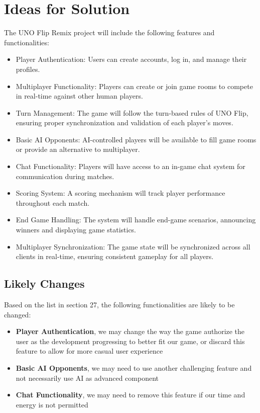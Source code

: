 \documentclass{article}
\begin{document}
\section{Ideas for Solution}
The UNO Flip Remix project will include the following features and functionalities:
\begin{itemize}
    \item Player Authentication: Users can create accounts, log in, and manage their profiles.
    \item Multiplayer Functionality: Players can create or join game rooms to compete in real-time against other human players.
    \item Turn Management: The game will follow the turn-based rules of UNO Flip, ensuring proper synchronization and validation of each player's moves.
    \item Basic AI Opponents: AI-controlled players will be available to fill game rooms or provide an alternative to multiplayer.
    \item Chat Functionality: Players will have access to an in-game chat system for communication during matches.
    \item Scoring System: A scoring mechanism will track player performance throughout each match.
    \item End Game Handling: The system will handle end-game scenarios, announcing winners and displaying game statistics.
    \item Multiplayer Synchronization: The game state will be synchronized across all clients in real-time, ensuring consistent gameplay for all players.
\end{itemize}

\subsection{Likely Changes}
Based on the list in section 27, the following functionalities are likely to be changed:
\begin{itemize}
    \item \textbf{Player Authentication}, we may change the way the game authorize the user as the development progressing to better fit our game, or discard this feature to allow for more casual user experience
    \item \textbf{Basic AI Opponents}, we may need to use another challenging feature and not necessarily use AI as advanced component
    \item \textbf{Chat Functionality}, we may need to remove this feature if our time and energy is not permitted
\end{itemize}
\end{document}
